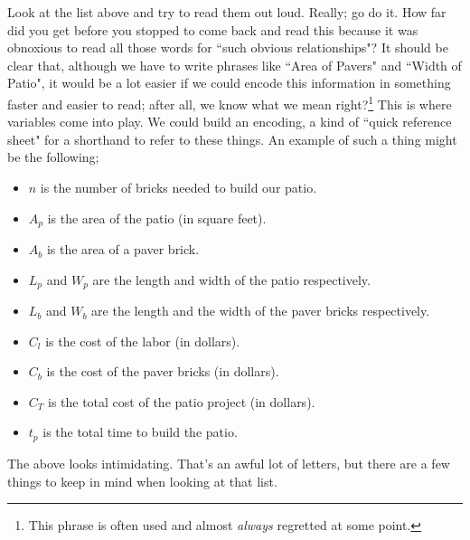\documentclass{ximera}
\begin{document}
Look at the list above and try to read them out loud. Really; go do it. How far did you get before you stopped to come back and read this because it was obnoxious to read all those words for ``such obvious relationships"? It should be clear that, although we have to write phrases like ``Area of Pavers" and ``Width of Patio", it would be a lot easier if we could encode this information in something faster and easier to read; after all, we know what we mean right?\footnote{This phrase is often used and almost \textit{always} regretted at some point.}
This is where variables come into play. We could build an encoding, a kind of ``quick reference sheet" for a shorthand to refer to these things. An example of such a thing might be the following;
\begin{itemize}
    \item $n$ is the number of bricks needed to build our patio.
    \item $A_p$ is the area of the patio (in square feet).
    \item $A_b$ is the area of a paver brick.
    \item $L_p$ and $W_p$ are the length and width of the patio respectively.
    \item $L_b$ and $W_b$ are the length and the width of the paver bricks respectively.
    \item $C_l$ is the cost of the labor (in dollars).
    \item $C_b$ is the cost of the paver bricks (in dollars).
    \item $C_T$ is the total cost of the patio project (in dollars).
    \item $t_p$ is the total time to build the patio.
\end{itemize}

The above looks intimidating. That's an awful lot of letters, but there are a few things to keep in mind when looking at that list. 
\end{document}
